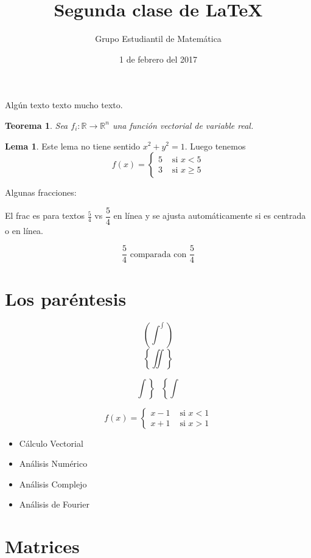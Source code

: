\documentclass[a4paper,12pt]{article}
\title{Segunda clase de \LaTeX}
\author{Grupo Estudiantil de Matemática}
\date{1 de febrero del 2017}
\theoremstyle{theorem}
\newtheorem{teo}{Teorema}[section]
\theoremstyle{definition}
\newtheorem{lema}{Lema}[section]
\begin{document}
	\maketitle
	Algún texto texto mucho texto.
	\begin{teo}
		Sea \( f_i \colon \mathbb{R} \to \mathbb{R}^n \) una función vectorial de variable real.
	\end{teo}
	\begin{lema} 
		Este lema no tiene sentido \( x^2+y^2=1 \). Luego tenemos 
		\[ f(x)=\begin{cases} 5 & \mbox{ si } x<5 \\ 3 & \mbox{ si } x\ge5  \end{cases} \]
	\end{lema}
	
	Algunas fracciones: 
	
	El frac es para textos \( \frac{5}{4} \) vs \( \dfrac{5}{4} \) en línea y se ajusta automáticamente si es centrada o en línea.
	
	\[ \frac{5}{4} \mbox{ comparada con } \dfrac{5}{4}  \]

	\section{Los paréntesis}
	
	\[   \left(  \int^\int  \right)  \]
	  \[ \left\lbrace \iint \right\rbrace \] 
	  
	 \[ \left. \int \right\rbrace ~~~ \left\lbrace \int \right. \]
	 
	 
	\[  f(x)= \begin{cases}
		 	x-1 & \mbox{ si } x<1 \\
		 	x+1 & \mbox{ si } x>1 
	       \end{cases} \]
	       
	       
	       \begin{itemize}
	       	\item Cálculo Vectorial %
	       	\item Análisis Numérico
	       	\item Análisis Complejo
	       	\item Análisis de Fourier
	       \end{itemize}
	       
\section{Matrices}
\end{document}
